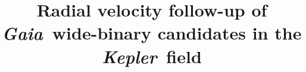 %
%
%
%


\newcommand{\Kepler}{{\it Kepler}}
\newcommand{\kepler}{{\it Kepler}}
\newcommand{\ktwo}{{\it K2}}
\newcommand{\Ktwo}{{\it K2}}
\newcommand{\gaia}{{\it Gaia}}
\newcommand{\Gaia}{{\it Gaia}}
\newcommand{\TGAS}{{\it TGAS}}
\newcommand{\tgas}{{\it TGAS}}
\newcommand{\mdm}{{\it MDM}}
\newcommand{\MDM}{{\it MDM}}
\newcommand{\aap}{AAP}
\newcommand{\apj}{ApJ}
\newcommand{\apjl}{ApJ Letters}
\newcommand{\apjs}{ApJ Supplement}
\newcommand{\mnras}{MNRAS}
\newcommand{\nat}{Nature}
\newcommand{\etal}{{\it et al.}}
\newcommand{\eg}{{\it e.g.}}



%
%

\title{Radial velocity follow-up of \Gaia\ wide-binary candidates in the
\Kepler\ field}

%
%
%

\begin{PI}
\end{PI}

